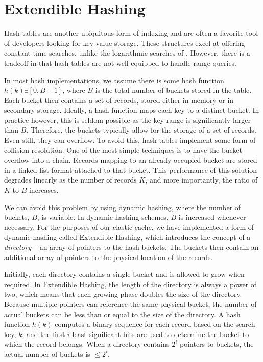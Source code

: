 \section{Extendible Hashing} %
\label{sec:extendible_hashing}
Hash tables are another ubiquitous form of indexing and are often a favorite
tool of developers looking for key-value storage. These structures excel at
offering constant-time searches, unlike the logarithmic searches of \bptrees.
However, there is a tradeoff in that hash tables are not well-equipped to
handle range queries.

In most hash implementations, we assume there is some hash function $h(k)
\exists [0, B-1]$, where $B$ is the total number of buckets stored in the
table. Each bucket then contains a set of records, stored either in memory or
in secondary storage. Ideally, a hash function maps each key to a distinct
bucket. In practice however, this is seldom possible as the key range is
significantly larger than $B$. Therefore, the buckets typically allow for the
storage of a set of records. Even still, they can overflow. To avoid this, hash
tables implement some form of collision resolution. One of the most simple
techniques is to have the bucket overflow into a chain. Records mapping to an
already occupied bucket are stored in a linked list format attached to that
bucket. This performance of this solution degrades linearly as the number of
records $K$, and more importantly, the ratio of $K$ to $B$ increases.

We can avoid this problem by using dynamic hashing\cite{dh2}, where the number
of buckets, $B$, is variable. In dynamic hashing schemes, $B$ is increased whenever
necessary. For the purposes of our elastic cache, we have implemented a form of
dynamic hashing called Extendible Hashing\cite{dh1}, which introduces the
concept of a \emph{directory} -- an array of pointers to the hash buckets. The
buckets then contain an additional array of pointers to the physical location
of the records.

Initially, each directory contains a single bucket and is allowed to grow
when required. In Extendible Hashing, the length of the directory is always a
power of two, which means that each growing phase doubles the size of the
directory. Because multiple pointers can reference the same physical bucket,
the number of actual buckets can be less than or equal to the size of the
directory. A hash function $h(k)$ computes a binary sequence for each record
based on the search key, $k$, and the first $i$ least significant bits are used
to determine the bucket to which the record belongs. When a directory contains
$2^i$ pointers to buckets, the actual number of buckets is $\leq 2^i$.

